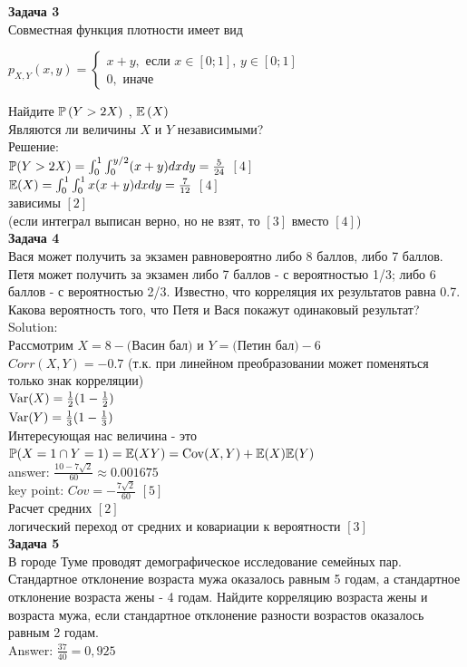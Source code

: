 \documentclass[12pt, a4paper]{article}\usepackage[]{graphicx}\usepackage[]{color}
\begin{document}
\textbf{Задача 3} \\ %
Совместная функция плотности имеет вид

$p_{X,Y} \left(x,y\right)=\left\{\begin{array}{l} {x+y,
\text{ если } x\in \left[0;1\right],\, y\in \left[0;1\right]} \\
{0,\text{ иначе} } \end{array}\right. $

Найдите  $\P\left(Y>2X\right)$ ,  $\E\left(X\right)$ \\
Являются ли величины $X$ и $Y$ независимыми? \\
Решение: \\
$\P(Y>2X)=\int_{0}^{1}\int_{0}^{y/2}(x+y)dxdy=\frac{5}{24}$ $[4]$\\
$\E(X)=\int_{0}^{1}\int_{0}^{1}x(x+y)dxdy=\frac{7}{12}$ $[4]$\\
зависимы $[2]$ \\
(если интеграл выписан верно, но не взят, то $[3]$ вместо $[4]$) \\


\textbf{Задача 4} \\
Вася может получить за экзамен равновероятно либо 8 баллов, либо 7 баллов. Петя может получить за экзамен либо 7 баллов - с вероятностью 1/3; либо 6 баллов - с вероятностью 2/3. Известно, что корреляция их результатов равна 0.7. \\
Какова вероятность того, что Петя и Вася покажут одинаковый результат? \\
Solution: \\
Рассмотрим $X=8-($Васин бал$)$ и $Y=($Петин бал$)-6$ \\
$Corr(X,Y)=-0.7$ (т.к. при линейном преобразовании может поменяться только знак корреляции) \\
$\Var(X)=\frac{1}{2}(1-\frac{1}{2})$ \\
$\Var(Y)=\frac{1}{3}(1-\frac{1}{3})$ \\
Интересующая нас величина - это $\P(X=1\cap Y=1)=\E(XY)=\Cov(X,Y)+\E(X)\E(Y)$ \\
answer: $\frac{10-7\sqrt{2}}{60}\approx 0.001675$ \\
key point: $Cov=-\frac{7\sqrt{2}}{60}$ $[5]$ \\
Расчет средних $[2]$ \\
логический переход от средних и ковариации к вероятности $[3]$ \\


\textbf{Задача 5} \\ %
В городе Туме проводят демографическое исследование семейных пар. Стандартное отклонение возраста мужа оказалось равным 5 годам, а стандартное отклонение возраста жены - 4 годам. Найдите корреляцию возраста жены и возраста мужа, если стандартное отклонение разности возрастов оказалось равным 2 годам. \\
Answer: $\frac{37}{40}=0,925$ \\
\end{document}
